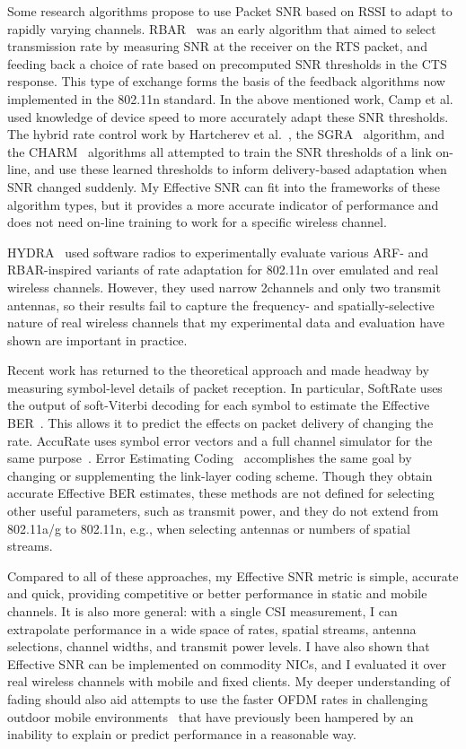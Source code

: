 Some research algorithms propose to use Packet SNR based on RSSI to adapt to rapidly varying channels. RBAR~\cite{Holland_RBAR} was an early algorithm that aimed to select transmission rate by measuring SNR at the receiver on the RTS packet, and feeding back a choice of rate based on precomputed SNR thresholds in the CTS response. This type of exchange forms the basis of the feedback algorithms now implemented in the 802.11n standard. In the above mentioned work, Camp et al. used knowledge of device speed to more accurately adapt these SNR thresholds. The hybrid rate control work by Hartcherev et al.~\cite{Haratcherev_Hybrid}, the SGRA~\cite{Zhang_SNRguided} algorithm, and the CHARM~\cite{Judd_CHARM} algorithms all attempted to train the SNR thresholds of a link on-line, and use these learned thresholds to inform delivery-based adaptation when SNR changed suddenly. My Effective SNR can fit into the frameworks of these algorithm types, but it provides a more accurate indicator of performance and does not need on-line training to work for a specific wireless channel.

HYDRA~\cite{Kim_Hydra} used software radios to experimentally evaluate various ARF- and RBAR-inspired variants of rate adaptation for 802.11n over emulated and real wireless channels. However, they used narrow 2\MHz channels and only two transmit antennas, so their results fail to capture the frequency- and spatially-selective nature of real wireless channels that my experimental data and evaluation have shown are important in practice.

Recent work has returned to the theoretical approach and made headway by measuring symbol-level details of packet reception. In particular, SoftRate uses the output of soft-Viterbi decoding for each symbol to estimate the Effective BER~\cite{Vutukuru_SoftRate}. This allows it to predict the effects on packet delivery of changing the rate. AccuRate uses symbol error vectors and a full channel simulator for the same purpose~\cite{Sen_AccuRate}. Error Estimating Coding~\cite{Chen_EEC} accomplishes the same goal by changing or supplementing the link-layer coding scheme. Though they obtain accurate Effective BER estimates, these methods are not defined for selecting other useful parameters, such as transmit power, and they do not extend from 802.11a/g to 802.11n, e.g., when selecting antennas or numbers of spatial streams.

Compared to all of these approaches, my Effective SNR metric is simple, accurate and quick, providing competitive or better performance in static and mobile channels. It is also more general: with a single CSI measurement, I can extrapolate performance in a wide space of rates, spatial streams, antenna selections, channel widths, and transmit power levels. I have also shown that Effective SNR can be implemented on commodity NICs, and I evaluated it over real wireless channels with mobile and fixed clients. My deeper understanding of fading should also aid attempts to use the faster OFDM rates in challenging outdoor mobile environments~\cite{Eriksson_Cabernet} that have previously been hampered by an inability to explain or predict performance in a reasonable way.

